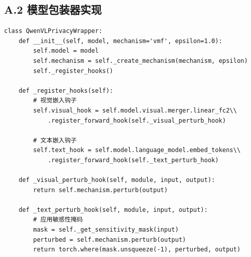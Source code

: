 \documentclass[a4paper,12pt]{article}
\begin{document}
\subsection*{A.2 模型包装器实现}

\begin{verbatim}
class QwenVLPrivacyWrapper:
    def __init__(self, model, mechanism='vmf', epsilon=1.0):
        self.model = model
        self.mechanism = self._create_mechanism(mechanism, epsilon)
        self._register_hooks()

    def _register_hooks(self):
        # 视觉嵌入钩子
        self.visual_hook = self.model.visual.merger.linear_fc2\\
            .register_forward_hook(self._visual_perturb_hook)

        # 文本嵌入钩子
        self.text_hook = self.model.language_model.embed_tokens\\
            .register_forward_hook(self._text_perturb_hook)

    def _visual_perturb_hook(self, module, input, output):
        return self.mechanism.perturb(output)

    def _text_perturb_hook(self, module, input, output):
        # 应用敏感性掩码
        mask = self._get_sensitivity_mask(input)
        perturbed = self.mechanism.perturb(output)
        return torch.where(mask.unsqueeze(-1), perturbed, output)
\end{verbatim}
\end{document}
